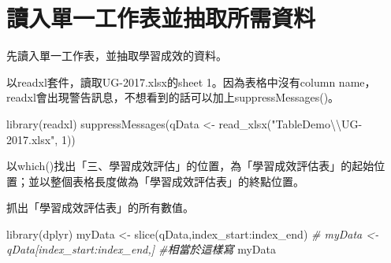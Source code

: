 \documentclass[
]{book}
\newenvironment{Shaded}{\begin{snugshade}}{\end{snugshade}}
\newcommand{\AttributeTok}[1]{\textcolor[rgb]{0.77,0.63,0.00}{#1}}
\newcommand{\CommentTok}[1]{\textcolor[rgb]{0.56,0.35,0.01}{\textit{#1}}}
\newcommand{\DecValTok}[1]{\textcolor[rgb]{0.00,0.00,0.81}{#1}}
\newcommand{\FunctionTok}[1]{\textcolor[rgb]{0.00,0.00,0.00}{#1}}
\newcommand{\NormalTok}[1]{#1}
\newcommand{\OtherTok}[1]{\textcolor[rgb]{0.56,0.35,0.01}{#1}}
\newcommand{\SpecialCharTok}[1]{\textcolor[rgb]{0.00,0.00,0.00}{#1}}
\newcommand{\StringTok}[1]{\textcolor[rgb]{0.31,0.60,0.02}{#1}}
\begin{document}
\hypertarget{ux8b80ux5165ux55aeux4e00ux5de5ux4f5cux8868ux4e26ux62bdux53d6ux6240ux9700ux8cc7ux6599}{%
\section{讀入單一工作表並抽取所需資料}\label{ux8b80ux5165ux55aeux4e00ux5de5ux4f5cux8868ux4e26ux62bdux53d6ux6240ux9700ux8cc7ux6599}}

先讀入單一工作表，並抽取學習成效的資料。

以readxl套件，讀取UG-2017.xlsx的sheet 1。因為表格中沒有column name，readxl會出現警告訊息，不想看到的話可以加上suppressMessages()。

\begin{Shaded}
\begin{Highlighting}[]
\FunctionTok{library}\NormalTok{(readxl)}
\FunctionTok{suppressMessages}\NormalTok{(qData }\OtherTok{\textless{}{-}} \FunctionTok{read\_xlsx}\NormalTok{(}\StringTok{"TableDemo}\SpecialCharTok{\textbackslash{}\textbackslash{}}\StringTok{UG{-}2017.xlsx"}\NormalTok{, }\DecValTok{1}\NormalTok{))}
\end{Highlighting}
\end{Shaded}

以which()找出「三、學習成效評估」的位置，為「學習成效評估表」的起始位置；並以整個表格長度做為「學習成效評估表」的終點位置。

\begin{Shaded}
\end{Shaded}

抓出「學習成效評估表」的所有數值。

\begin{Shaded}
\begin{Highlighting}[]
\FunctionTok{library}\NormalTok{(dplyr)}
\NormalTok{myData }\OtherTok{\textless{}{-}} \FunctionTok{slice}\NormalTok{(qData,index\_start}\SpecialCharTok{:}\NormalTok{index\_end)  }
\CommentTok{\# myData \textless{}{-} qData[index\_start:index\_end,]  \#相當於這樣寫 }
\NormalTok{myData}
\end{Highlighting}
\end{Shaded}
\end{document}
